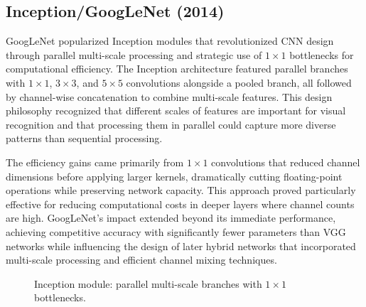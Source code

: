 \subsection{Inception/GoogLeNet (2014)}
\label{subsec:inception}

GoogLeNet popularized Inception modules that revolutionized CNN design through parallel multi-scale processing and strategic use of $1\times1$ bottlenecks for computational efficiency. The Inception architecture featured parallel branches with $1\times1$, $3\times3$, and $5\times5$ convolutions alongside a pooled branch, all followed by channel-wise concatenation to combine multi-scale features. This design philosophy recognized that different scales of features are important for visual recognition and that processing them in parallel could capture more diverse patterns than sequential processing.

The efficiency gains came primarily from $1\times1$ convolutions that reduced channel dimensions before applying larger kernels, dramatically cutting floating-point operations while preserving network capacity. This approach proved particularly effective for reducing computational costs in deeper layers where channel counts are high. GoogLeNet's impact extended beyond its immediate performance, achieving competitive accuracy with significantly fewer parameters than VGG networks while influencing the design of later hybrid networks that incorporated multi-scale processing and efficient channel mixing techniques.

\begin{figure}[h]
    \centering
    \caption{Inception module: parallel multi-scale branches with $1\times1$ bottlenecks.}
    \label{fig:inception-module}
\end{figure}

